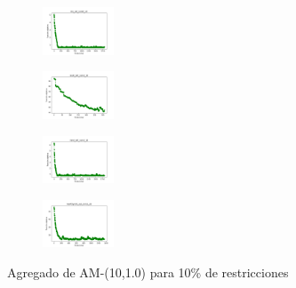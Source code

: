 \begin{figure}[H]
\begin{subfigure}
    \end{subfigure}
    \hfill
    \begin{subfigure}
        \centering
        \includegraphics[width=0.234\textwidth]{img/am10/iris_set_const_10_3773969821_cost.png}
    \end{subfigure}
    \hfill
    \begin{subfigure}
        \centering
        \includegraphics[width=0.234\textwidth]{img/am10/ecoli_set_const_10_3773969821_cost.png}
    \end{subfigure}
    \hfill
    \begin{subfigure}
        \centering
        \includegraphics[width=0.234\textwidth]{img/am10/rand_set_const_10_3773969821_cost.png}
    \end{subfigure}
    \hfill
    \begin{subfigure}
        \centering
        \includegraphics[width=0.234\textwidth]{img/am10/newthyroid_set_const_10_3773969821_cost.png}
    \end{subfigure}
    \caption{Agregado de AM-(10,1.0) para 10\% de restricciones}
\end{figure}


\vspace*{\fill}
\newpage
\vspace*{\fill}

